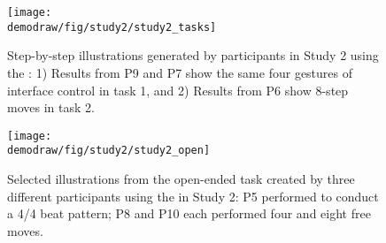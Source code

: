 \begin{appendices}
   \vspace{6mm}
\begin{figure}[h!]
     \centering
    \texttt{[image: \\demodraw/fig/study2/study2\_tasks]}
    \caption{Step-by-step illustrations generated by participants in Study 2 using the \phaseI{}: 1) Results from P9 and P7 show the same four gestures of interface control in task 1, and 2) Results from P6 show 8-step moves in task 2.}
    \label{fig:study_authoring_tasks}
   \end{figure}

\begin{figure}[h!]
     \centering
    \texttt{[image: \\demodraw/fig/study2/study2\_open]}
    \caption{Selected illustrations from the open-ended task created by three different participants using the \phaseI{} in Study 2: P5 performed to conduct a 4/4 beat pattern; P8 and P10 each performed four and eight free moves.}
    \label{fig:open_ended_examples}
 \end{figure}

\end{appendices}
